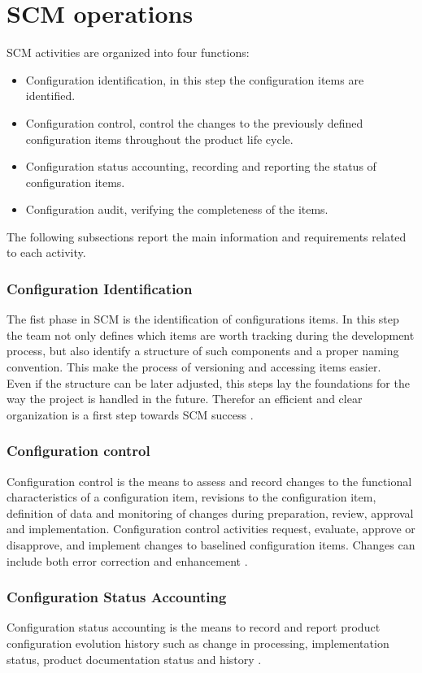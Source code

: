 \documentclass[../main.tex]{subfiles}
\begin{document}
\section{SCM operations}
\gls{SCM} activities are organized into four functions:
\begin{itemize}
    \item Configuration identification, in this step the configuration items are identified.
    \item Configuration control, control the changes to the previously defined configuration items throughout the product life cycle.
    \item Configuration status accounting, recording and reporting the status of configuration items.
    \item Configuration audit, verifying the completeness of the items. 
\end{itemize}
The following subsections report the main information and requirements related to each activity.
\subsubsection{Configuration Identification}
The fist phase in \gls{SCM} is the identification of configurations items. In this step the team not only defines which items are worth tracking during the development process, but also identify a structure of such components and a proper naming convention. This make the process of versioning and accessing items easier.\\
Even if the structure can be later adjusted, this steps lay the foundations for the way the project is handled in the future. Therefor an efficient and clear organization is a first step towards \gls{SCM} success \cite{ieestandard}.
\subsubsection{Configuration control}
Configuration control is the means to assess and record changes to the functional characteristics of a configuration item, revisions to the configuration item, definition of data and monitoring of changes during preparation, review, approval and implementation. Configuration control activities request, evaluate, approve or disapprove, and implement changes to baselined configuration items. Changes can include both error correction and enhancement \cite{ieestandard}.
\subsubsection{Configuration Status Accounting}
Configuration status accounting is the means to record and report product configuration evolution history such as change in processing, implementation status, product documentation status and history \cite{ieestandard}.
\end{document}
